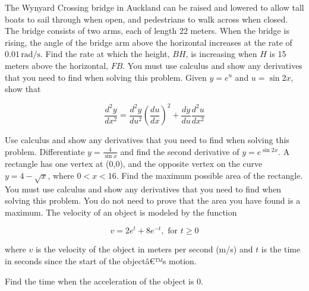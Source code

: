 \documentclass[12pt,addpoints]{exam}
\begin{document}
\begin{questions}
\fillwithlines{3cm}
\question[5] The Wynyard Crossing bridge in Auckland can be raised and lowered to allow tall boats to sail through when open, and pedestrians to walk across when closed. The bridge consists of two arms, each of length 22 meters. When the bridge is rising, the angle of the bridge arm above the horizontal increases at the rate of \(0.01 \, \text{rad/s}\). Find the rate at which the height, \(BH\), is increasing when \(H\) is 15 meters above the horizontal, \(FB\). You must use calculus and show any derivatives that you need to find when solving this problem.
\fillwithlines{3cm}
\question[5] Given \( y = e^u \) and \( u = \sin 2x \), show that

\[
\frac{d^2 y}{dx^2} = \frac{d^2 y}{du^2} \left( \frac{du}{dx} \right)^2 + \frac{dy}{du} \frac{d^2 u}{dx^2}
\]

Use calculus and show any derivatives that you need to find when solving this problem.
\fillwithlines{3cm}
\question[5] Differentiate \( y = \frac{4}{\sin x} \) and find the second derivative of \( y = e^{\sin 2x} \).
\fillwithlines{3cm}
\question[5] A rectangle has one vertex at (0,0), and the opposite vertex on the curve \( y = 4 - \sqrt{x} \), where \( 0 < x < 16 \). Find the maximum possible area of the rectangle. You must use calculus and show any derivatives that you need to find when solving this problem. You do not need to prove that the area you have found is a maximum.
\fillwithlines{3cm}
\question[5] The velocity of an object is modeled by the function

\[ v = 2e^t + 8e^{-t}, \text{ for } t \geq 0 \]

where \( v \) is the velocity of the object in meters per second (m/s) and \( t \) is the time in seconds since the start of the objectâ€™s motion.

Find the time when the acceleration of the object is 0.


\end{questions}
\end{document}
